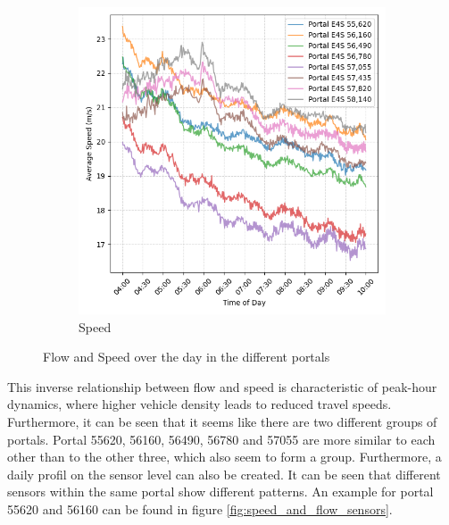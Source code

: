 \begin{figure}[H]
\begin{subfigure}{0.49 \linewidth}
			\includegraphics[width=\textwidth]{../Plots/Speed/speed_comparison_portals}
			\caption{Speed}
		\end{subfigure}
		\caption{Flow and Speed over the day in the different portals }
		\label{fig:speed_and_flow_portals}
	\end{figure}
	\noindent This inverse relationship between flow and speed is characteristic of peak-hour dynamics, where higher vehicle density leads to reduced travel speeds.
	Furthermore, it can be seen that it seems like there are two different groups of portals. Portal 55620, 56160, 56490, 56780 and 57055 are more similar to each other than to the other three, which also seem to form a group. \newline 
	\noindent Furthermore, a daily profil on the sensor level can also be created. It can be seen that different sensors within the same portal show different patterns. An example for portal 55620 and 56160 can be found in figure \ref{fig:speed_and_flow_sensors}.
	
	
	

